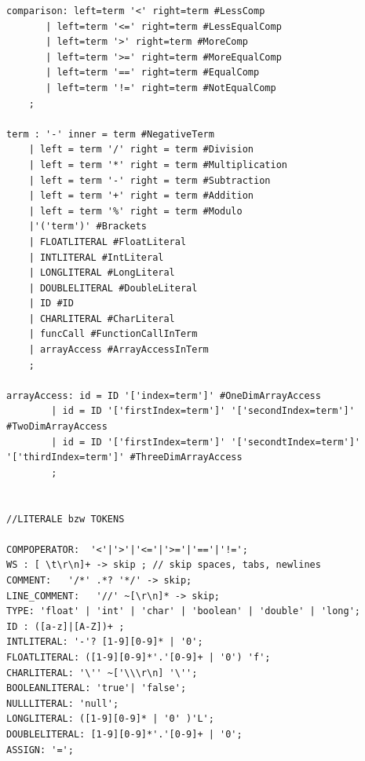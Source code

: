 \documentclass[parskip=full]{scrartcl}
\begin{document}
\begin{verbatim}
comparison: left=term '<' right=term #LessComp
	   | left=term '<=' right=term #LessEqualComp
	   | left=term '>' right=term #MoreComp
	   | left=term '>=' right=term #MoreEqualComp
	   | left=term '==' right=term #EqualComp
	   | left=term '!=' right=term #NotEqualComp
	;

term : '-' inner = term #NegativeTerm
    | left = term '/' right = term #Division
	| left = term '*' right = term #Multiplication
	| left = term '-' right = term #Subtraction
	| left = term '+' right = term #Addition
	| left = term '%' right = term #Modulo
	|'('term')' #Brackets
	| FLOATLITERAL #FloatLiteral
	| INTLITERAL #IntLiteral
	| LONGLITERAL #LongLiteral
	| DOUBLELITERAL #DoubleLiteral
	| ID #ID
	| CHARLITERAL #CharLiteral
	| funcCall #FunctionCallInTerm
	| arrayAccess #ArrayAccessInTerm
	;

arrayAccess: id = ID '['index=term']' #OneDimArrayAccess
		| id = ID '['firstIndex=term']' '['secondIndex=term']' #TwoDimArrayAccess
		| id = ID '['firstIndex=term']' '['secondtIndex=term']' '['thirdIndex=term']' #ThreeDimArrayAccess
		;


//LITERALE bzw TOKENS

COMPOPERATOR:  '<'|'>'|'<='|'>='|'=='|'!=';
WS : [ \t\r\n]+ -> skip ; // skip spaces, tabs, newlines
COMMENT:   '/*' .*? '*/' -> skip;
LINE_COMMENT:   '//' ~[\r\n]* -> skip;
TYPE: 'float' | 'int' | 'char' | 'boolean' | 'double' | 'long';
ID : ([a-z]|[A-Z])+ ;
INTLITERAL: '-'? [1-9][0-9]* | '0';
FLOATLITERAL: ([1-9][0-9]*'.'[0-9]+ | '0') 'f';
CHARLITERAL: '\'' ~['\\\r\n] '\'';
BOOLEANLITERAL:	'true'|	'false';
NULLLITERAL: 'null';
LONGLITERAL: ([1-9][0-9]* | '0' )'L';
DOUBLELITERAL: [1-9][0-9]*'.'[0-9]+ | '0';
ASSIGN: '=';
\end{verbatim}
\end{document}
